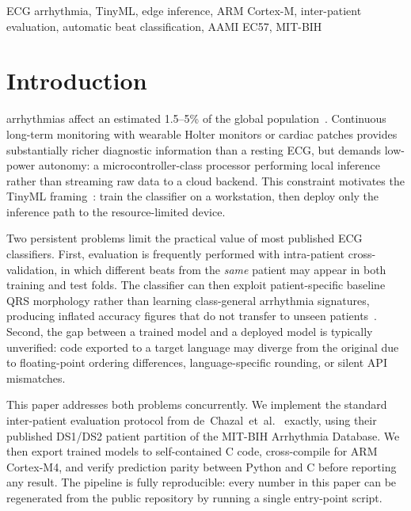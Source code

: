 \documentclass[journal,twoside]{IEEEtran}
\begin{document}
\begin{IEEEkeywords}
ECG arrhythmia, TinyML, edge inference, ARM Cortex-M, inter-patient
evaluation, automatic beat classification, AAMI EC57, MIT-BIH
\end{IEEEkeywords}

\section{Introduction}
 arrhythmias affect an estimated 1.5--5\% of the
global population~\cite{ZoniBerisso2014}. Continuous long-term monitoring with
wearable Holter monitors or cardiac patches provides substantially richer
diagnostic information than a resting ECG, but demands low-power
autonomy: a microcontroller-class processor performing local inference
rather than streaming raw data to a cloud backend. This constraint
motivates the TinyML framing~\cite{Warden2019}: train the classifier on
a workstation, then deploy only the inference path to the resource-limited
device.

Two persistent problems limit the practical value of most published ECG
classifiers. First, evaluation is frequently performed with intra-patient
cross-validation, in which different beats from the \emph{same} patient
may appear in both training and test folds. The classifier can then
exploit patient-specific baseline QRS morphology rather than learning
class-general arrhythmia signatures, producing inflated accuracy figures
that do not transfer to unseen patients~\cite{deChazal2004}.
Second, the gap between a trained model and a deployed model is typically
unverified: code exported to a target language may diverge from the
original due to floating-point ordering differences, language-specific
rounding, or silent API mismatches.

This paper addresses both problems concurrently. We implement the
standard inter-patient evaluation protocol from de~Chazal~et~al.\
\cite{deChazal2004} exactly, using their published DS1/DS2 patient
partition of the MIT-BIH Arrhythmia Database. We then export trained
models to self-contained C code, cross-compile for ARM Cortex-M4, and
verify prediction parity between Python and C before reporting any result.
The pipeline is fully reproducible: every number in this paper can be
regenerated from the public repository by running a single entry-point
script.
\end{document}
